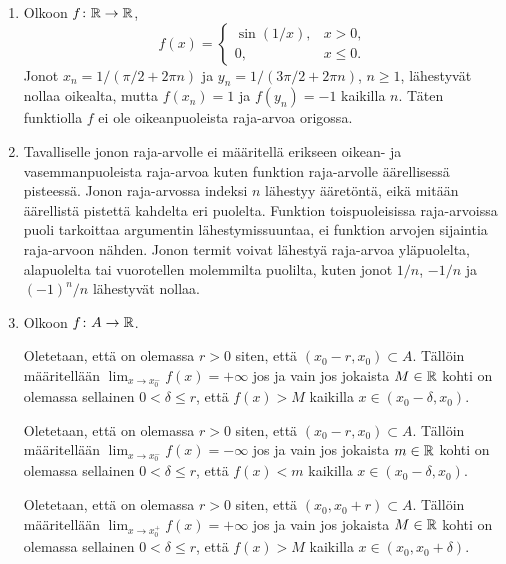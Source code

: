\documentclass[11pt,a4paper]{amsart}
\begin{document}
\begin{solution}
  \leavevmode\par
  \begin{enumerate}[label=(\alph*), nosep]
    \item Olkoon \(f \colon \mathbb{R} \to \mathbb{R}\),
      \[
        f(x) =
        \begin{cases}
          \sin(1/x), & x > 0, \\
          0, & x \leq 0.
        \end{cases}
      \]
      Jonot \(x_n = 1/(\pi/2 + 2\pi n)\) ja
      \(y_n = 1/(3\pi/2 + 2\pi n)\), \(n \geq 1\), lähestyvät nollaa
      oikealta, mutta \(f(x_n) = 1\) ja \(f(y_n) = -1\) kaikilla \(n\).
      Täten funktiolla \(f\) ei ole oikeanpuoleista raja-arvoa origossa.
    \item Tavalliselle jonon raja-arvolle ei määritellä erikseen oikean- ja
      vasemmanpuoleista raja-arvoa kuten funktion raja-arvolle äärellisessä
      pisteessä. Jonon raja-arvossa indeksi \(n\) lähestyy ääretöntä, eikä
      mitään äärellistä pistettä kahdelta eri puolelta. Funktion
      toispuoleisissa raja-arvoissa puoli tarkoittaa argumentin
      lähestymissuuntaa, ei funktion arvojen sijaintia raja-arvoon nähden.
      Jonon termit voivat lähestyä raja-arvoa yläpuolelta, alapuolelta tai
      vuorotellen molemmilta puolilta, kuten jonot \(1/n\), \(-1/n\) ja
      \((-1)^n/n\) lähestyvät nollaa.
    \item Olkoon \(f \colon A \to \mathbb{R}\).

      Oletetaan, että on olemassa \(r > 0\) siten, että
      \((x_0 - r, x_0) \subset A\). Tällöin määritellään
      \(\lim_{x \to x_0^-} f(x) = +\infty\) jos ja vain jos jokaista
      \(M \in \mathbb{R}\) kohti on olemassa sellainen \(0 < \delta \leq r\), että
      \(f(x) > M\) kaikilla \(x \in (x_0 - \delta, x_0)\).

      Oletetaan, että on olemassa \(r > 0\) siten, että
      \((x_0 - r, x_0) \subset A\). Tällöin määritellään
      \(\lim_{x \to x_0^-} f(x) = -\infty\) jos ja vain jos jokaista
      \(m \in \mathbb{R}\) kohti on olemassa sellainen \(0 < \delta \leq r\), että
      \(f(x) < m\) kaikilla \(x \in (x_0 - \delta, x_0)\).

      Oletetaan, että on olemassa \(r > 0\) siten, että
      \((x_0, x_0 + r) \subset A\). Tällöin määritellään
      \(\lim_{x \to x_0^+} f(x) = +\infty\) jos ja vain jos jokaista
      \(M \in \mathbb{R}\) kohti on olemassa sellainen \(0 < \delta \leq r\), että
      \(f(x) > M\) kaikilla \(x \in (x_0, x_0 + \delta)\).


\end{enumerate}
\end{solution}
\end{document}
